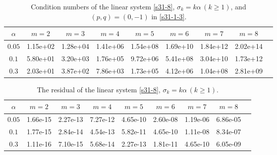 \documentclass[10pt]{siamltex}
\begin{document}
\begin{table}[!h]
\caption{Condition numbers of the linear system \eqref{s31-8},
$\sigma_k=k\alpha\,(k\geq 1)$, and $(p,q)=(0,-1)$ in \eqref{s31-1-3}.\label{tb2-1}}
 \centering \footnotesize
\begin{tabular}{|c|c|c|c |c | c|c|c|c|}\hline
$\alpha$& $m=2$   &   $m=3$   &  $m=4$  &  $m=5$  &   $m=6$   &  $m=7$  &  $m=8$ \\ \hline
$0.05$ &1.15e+02&1.28e+04&1.41e+06&1.54e+08&1.69e+10&1.84e+12&2.02e+14 \\ \hline
$0.1$  &5.80e+01&3.20e+03&1.76e+05&9.72e+06&5.41e+08&3.04e+10&1.73e+12\\ \hline
$0.3$  &2.03e+01&3.87e+02&7.86e+03&1.73e+05&4.12e+06&1.04e+08&2.81e+09\\ \hline
\end{tabular}
\end{table}

\begin{table}[!h]
\caption{The residual  of the linear system \eqref{s31-8},
$\sigma_k=k\alpha\,(k\geq 1)$.\label{tb2-2}}
 \centering\footnotesize
\begin{tabular}{|c|c|c|c |c | c|c|c|c|}\hline
$\alpha$& $m=2$   &   $m=3$   &  $m=4$  &  $m=5$  &   $m=6$   &  $m=7$  &  $m=8$ \\ \hline
$0.05$ &1.66e-15&2.27e-13&7.27e-12&4.65e-10&2.60e-08&1.19e-06&6.86e-05 \\ \hline
$0.1$  &1.77e-15&2.84e-14&4.54e-13&5.82e-11&4.65e-10&1.11e-08&8.34e-07 \\ \hline
$0.3$  &1.11e-16&7.10e-15&5.68e-14&2.27e-13&1.81e-11&4.65e-10&6.05e-09 \\ \hline
\end{tabular}%
\end{table}
\end{document}
